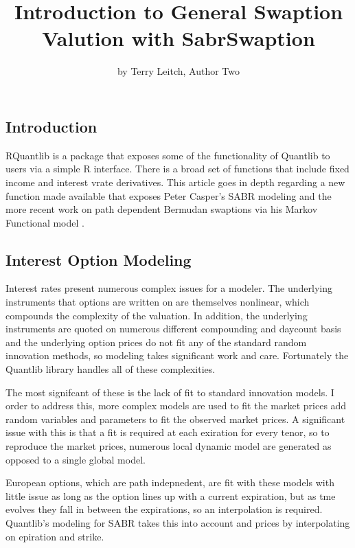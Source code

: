 \title{Introduction to General Swaption Valution with SabrSwaption}
\author{by Terry Leitch, Author Two}

\maketitle


\subsection{Introduction}\label{introduction}

RQuantlib is a package that exposes some of the functionality of
Quantlib to users via a simple R interface. There is a broad set of
functions that include fixed income and interest vrate derivatives. This
article goes in depth regarding a new function made available that
exposes Peter Casper's SABR modeling and the more recent work on path
dependent Bermudan swaptions via his Markov Functional model
\citet{caspers}.

\subsection{Interest Option Modeling}\label{interest-option-modeling}

Interest rates present numerous complex issues for a modeler. The
underlying instruments that options are written on are themselves
nonlinear, which compounds the complexity of the valuation. In addition,
the underlying instruments are quoted on numerous different compounding
and daycount basis and the underlying option prices do not fit any of
the standard random innovation methods, so modeling takes significant
work and care. Fortunately the Quantlib library handles all of these
complexities.

The most signifcant of these is the lack of fit to standard innovation
models. I order to address this, more complex models are used to fit the
market prices add random variables and parameters to fit the observed
market prices. A significant issue with this is that a fit is required
at each exiration for every tenor, so to reproduce the market prices,
numerous local dynamic model are generated as opposed to a single global
model.

European options, which are path indepnedent, are fit with these models
with little issue as long as the option lines up with a current
expiration, but as tme evolves they fall in between the expirations, so
an interpolation is required. Quantlib's modeling for SABR takes this
into account and prices by interpolating on epiration and strike.

